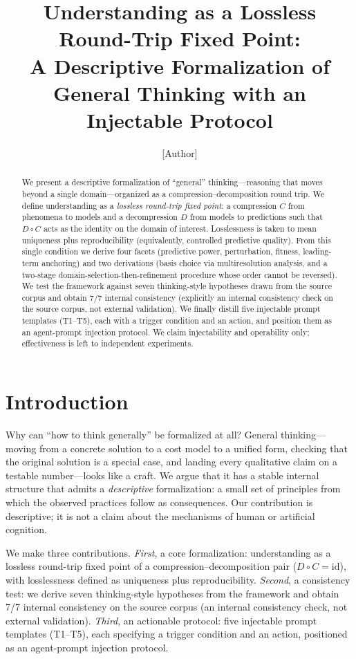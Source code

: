 \documentclass[11pt]{article}
\title{Understanding as a Lossless Round-Trip Fixed Point:\\
A Descriptive Formalization of General Thinking with an Injectable Protocol}
\author{[Author]}
\date{}
\newcommand{\Cmap}{C}
\newcommand{\Dmap}{D}
\begin{document}
\maketitle

\begin{abstract}
We present a descriptive formalization of ``general'' thinking---reasoning that
moves beyond a single domain---organized as a compression--decomposition round
trip. We define understanding as a \emph{lossless round-trip fixed point}: a
compression $\Cmap$ from phenomena to models and a decompression $\Dmap$ from
models to predictions such that $\Dmap\circ\Cmap$ acts as the identity on the
domain of interest. Losslessness is taken to mean uniqueness plus reproducibility
(equivalently, controlled predictive quality). From this single condition we
derive four facets (predictive power, perturbation, fitness, leading-term
anchoring) and two derivations (basis choice via multiresolution analysis, and a
two-stage domain-selection-then-refinement procedure whose order cannot be
reversed). We test the framework against seven thinking-style hypotheses drawn
from the source corpus and obtain 7/7 internal consistency (explicitly an
internal consistency check on the source corpus, not external validation). We
finally distill five injectable prompt templates (T1--T5), each with a trigger
condition and an action, and position them as an agent-prompt injection protocol.
We claim injectability and operability only; effectiveness is left to independent
experiments.
\end{abstract}
\section{Introduction}
\label{sec:intro}

Why can ``how to think generally'' be formalized at all? General thinking---
moving from a concrete solution to a cost model to a unified form, checking that
the original solution is a special case, and landing every qualitative claim on
a testable number---looks like a craft. We argue that it has a stable internal
structure that admits a \emph{descriptive} formalization: a small set of
principles from which the observed practices follow as consequences. Our
contribution is descriptive; it is not a claim about the mechanisms of human or
artificial cognition.

We make three contributions. \emph{First}, a core formalization: understanding
as a lossless round-trip fixed point of a compression--decomposition pair
($\Dmap\circ\Cmap=\mathrm{id}$), with losslessness defined as uniqueness plus
reproducibility. \emph{Second}, a consistency test: we derive seven
thinking-style hypotheses from the framework and obtain 7/7 internal consistency
on the source corpus (an internal consistency check, not external validation).
\emph{Third}, an actionable protocol: five injectable prompt templates
(T1--T5), each specifying a trigger condition and an action, positioned as an
agent-prompt injection protocol.
\end{document}
